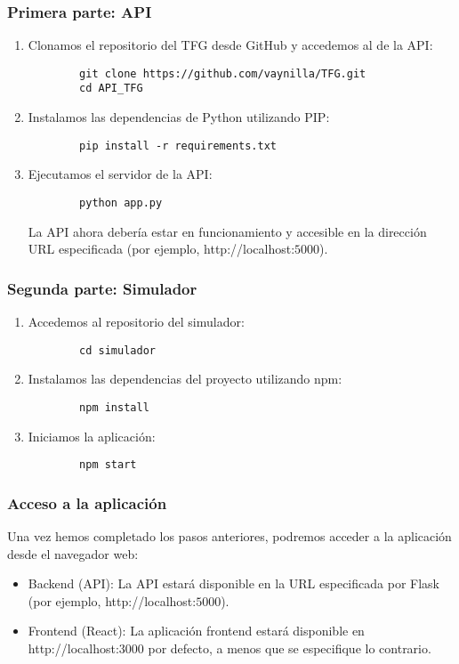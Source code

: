 \subsubsection{Primera parte: API}
\begin{enumerate}
	\item Clonamos el repositorio del TFG desde GitHub y accedemos al de la API:
	\begin{verbatim}
		git clone https://github.com/vaynilla/TFG.git
		cd API_TFG
	\end{verbatim}
	\item Instalamos las dependencias de Python utilizando PIP:
	\begin{verbatim}
		pip install -r requirements.txt
	\end{verbatim}
	\item Ejecutamos el servidor de la API:
	\begin{verbatim}
		python app.py
	\end{verbatim}
	La API ahora debería estar en funcionamiento y accesible en la dirección URL especificada (por ejemplo, http://localhost:$5000$).
\end{enumerate}
\subsubsection{Segunda parte: Simulador}
\begin{enumerate}
	\item Accedemos al repositorio del simulador:
	\begin{verbatim}
		cd simulador
	\end{verbatim}
	\item Instalamos las dependencias del proyecto utilizando npm:
	\begin{verbatim}
		npm install
	\end{verbatim}
	\item Iniciamos la aplicación:
	\begin{verbatim}
		npm start
	\end{verbatim}
\end{enumerate}
\subsubsection{Acceso a la aplicación}
Una vez hemos completado los pasos anteriores, podremos acceder a la aplicación desde el navegador web:
\begin{itemize}
	\item Backend (API): La API estará disponible en la URL especificada por Flask (por ejemplo, http://localhost:$5000$).
	\item Frontend (React): La aplicación frontend estará disponible en http://localhost:$3000$ por defecto, a menos que se especifique lo contrario.
\end{itemize}




\endinput
-